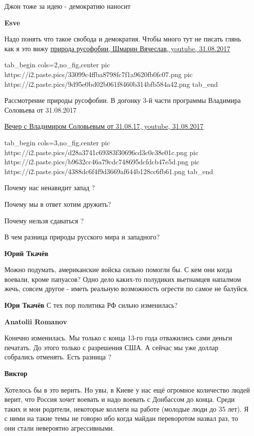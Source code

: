 \begin{itemize}

Джон тоже за идею - демократию наносит

\textbf{Esve}

Надо понять что такое свобода и демократия. Чтобы много тут не писать глянь как
я это вижу \href{https://youtu.be/hn3p9s9dRkE}{%
природа русофобии, Шмарин Вячеслав, youtube, 31.08.2017%
}


\ifcmt
  tab_begin cols=2,no_fig,center
     pic https://i2.paste.pics/33099c4ffba8798fc7f1a9620fb0fc07.png
		 pic https://i2.paste.pics/9d95e0bd02b061f8460b314bfb584a42.png
  tab_end
\fi

Рассмотрение природы русофобии. В догонку 3-й части программы Владимира Соловьева от 31.08.2017 

\href{https://youtu.be/Cr2GYByLcPk}{%
Вечер с Владимиром Соловьевым от 31.08.17, youtube, 31.08.2017%
}

\ifcmt
  tab_begin cols=3,no_fig,center
		pic https://i2.paste.pics/d28a3741c69383f30696cd3c0c38e01c.png
		pic https://i2.paste.pics/b9632cc46a79cdc748695dcfdcb47e5d.png
		pic https://i2.paste.pics/4388dc6f4f9d3669af644b128cc6fb61.png
  tab_end
\fi

Почему нас ненавидит запад ?

Почему мы в ответ хотим дружить?

Почему нельзя сдаваться ?

В чем разница природы русского мира и западного?

\textbf{Юрий Ткачёв}

Можно подумать, американские войска сильно помогли бы. С кем они когда воевали,
кроме папуасов? Одно дело каких-то полудиких вьетнамцев напалмом жечь, совсем
другое - иметь реальную возможность огрести по самое не балуйся.

\textbf{Юри Ткачёв}
С тех пор политика РФ сильно изменилась?

\textbf{Anatolii Romanov}

Конечно изменилась. Мы только с конца 13-го года отважились сами деньги
печатать. До этого только с разрешения США.  А сейчас мы уже доллар собрались
отменять. Есть разница ?

\textbf{Виктор}

Хотелось бы в это верить. Но увы, в Киеве у нас ещё огромное количество людей
верит, что Россия хочет воевать и надо воевать с Донбассом до конца. Среди
таких и мои родители, некоторые коллеги на работе (молодые люди до 35 лет). Я с
ними на такие темы не говорю ибо когда майдан переворотом назвал раз, то они
стали невероятно агрессивными.


\end{itemize}
